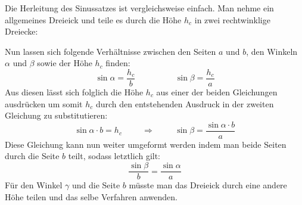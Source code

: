 Die Herleitung des Sinussatzes ist vergleichsweise einfach. Man nehme ein allgemeines Dreieick und teile es durch die H\"{o}he $h_c$ in zwei rechtwinklige Dreiecke:

\begin{figure}[h!]
\end{figure}

Nun lassen sich folgende Verh\"{a}ltnisse zwischen den Seiten $a$ und $b$, den Winkeln $\alpha$ und $\beta$ sowie der H\"{o}he $h_c$ finden: $$\sin \alpha = \frac{h_c}{b} \hspace{2cm} \sin \beta = \frac{h_c}{a}$$ Aus diesen l\"{a}sst sich folglich die H\"{o}he $h_c$ aus einer der beiden Gleichungen ausdr\"{u}cken um somit $h_c$ durch den entstehenden Ausdruck in der zweiten Gleichung zu substitutieren: $$\sin \alpha \cdot b = h_c \hspace{1cm} \Rightarrow \hspace{1cm} \sin \beta = \frac{\sin \alpha \cdot b}{a}$$ Diese Gleichung kann nun weiter umgeformt werden indem man beide Seiten durch die Seite $b$ teilt, sodass letztlich gilt: $$\frac{\sin \beta}{b} = \frac{\sin \alpha}{a}$$ F\"{u}r den Winkel $\gamma$ und die Seite $b$ m\"{u}sste man das Dreieick durch eine andere H\"{o}he teilen und das selbe Verfahren anwenden.

